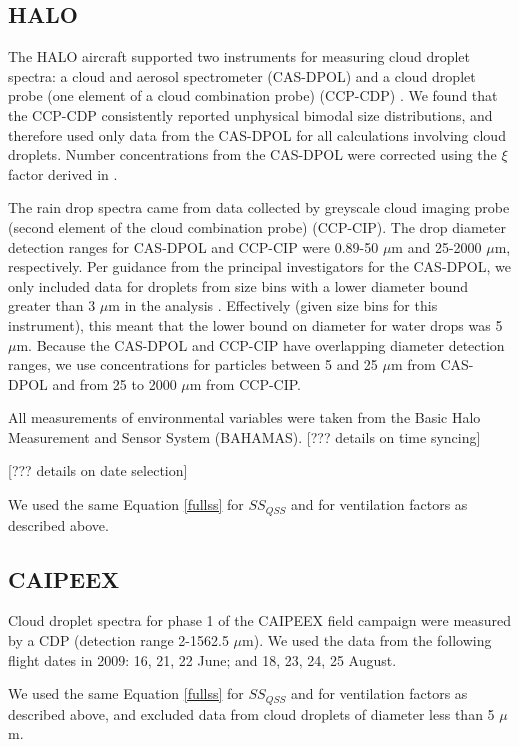 \documentclass{article}
\begin{document}
\subsection{HALO}

The HALO aircraft supported two instruments for measuring cloud droplet spectra: a cloud and aerosol spectrometer (CAS-DPOL) and a cloud droplet probe (one element of a cloud combination probe) (CCP-CDP) \cite{Braga2017}. We found that the CCP-CDP consistently reported unphysical bimodal size distributions, and therefore used only data from the CAS-DPOL for all calculations involving cloud droplets. Number concentrations from the CAS-DPOL were corrected using the $\xi$ factor derived in \cite{Weigel2016}.

The rain drop spectra came from data collected by greyscale cloud imaging probe (second element of the cloud combination probe) (CCP-CIP). The drop diameter detection ranges for CAS-DPOL and CCP-CIP were 0.89-50 $\mu$m and 25-2000 $\mu$m, respectively. Per guidance from the principal investigators for the CAS-DPOL, we only included data for droplets from size bins with a lower diameter bound greater than 3 $\mu$m in the analysis \cite{Jurkat2020}. Effectively (given size bins for this instrument), this meant that the lower bound on diameter for water drops was 5 $\mu$m. Because the CAS-DPOL and CCP-CIP have overlapping diameter detection ranges, we use concentrations for particles between 5 and 25 $\mu$m from CAS-DPOL and from 25 to 2000 $\mu$m from CCP-CIP. 

All measurements of environmental variables were taken from the Basic Halo Measurement and Sensor System (BAHAMAS). [??? details on time syncing]

[??? details on date selection]

We used the same Equation \ref{fullss} for $SS_{QSS}$ and for ventilation factors as described above.

\subsection{CAIPEEX}

Cloud droplet spectra for phase 1 of the CAIPEEX field campaign were measured by a CDP (detection range 2-1562.5 $\mu$m). We used the data from the following flight dates in 2009: 16, 21, 22 June; and 18, 23, 24, 25 August.

We used the same Equation \ref{fullss} for $SS_{QSS}$ and for ventilation factors as described above, and excluded data from cloud droplets of diameter less than 5 $\mu$m.
\end{document}
